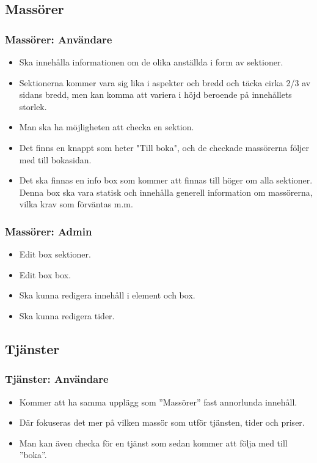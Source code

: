 \documentclass[11pt, titlepage, oneside, a4paper]{article}	%
\begin{document}
\newpage
\subsection{Massörer}
	\subsubsection*{Massörer: Användare}
	\begin{itemize}
		\item Ska innehålla informationen om de olika anställda i form av sektioner.
		\item Sektionerna kommer vara sig lika i aspekter och bredd och täcka cirka 2/3 av sidans bredd, men kan komma att variera i höjd beroende på innehållets storlek.
		\item Man ska ha möjligheten att checka en sektion.
		\item Det finns en knappt som heter "Till boka", och de checkade massörerna följer med till bokasidan. 
		\item Det ska finnas en info box som kommer att finnas till höger om alla sektioner. Denna box ska vara statisk och innehålla generell information om massörerna, vilka krav som förväntas m.m. 
	\end{itemize}
	
	\subsubsection*{Massörer: Admin}
	\begin{itemize}
		\item Edit box sektioner.
		\item Edit box box.
		\item Ska kunna redigera innehåll i element och box.
		\item Ska kunna redigera tider.
	\end{itemize} 

\subsection{Tjänster}
	\subsubsection*{Tjänster: Användare}
	\begin{itemize}
		\item Kommer att ha samma upplägg som ”Massörer” fast annorlunda innehåll.
		\item Där fokuseras det mer på vilken massör som utför tjänsten, tider och priser. 
		\item Man kan även checka för en tjänst som sedan kommer att följa med till ”boka”. 
	\end{itemize}
	
\end{document}
